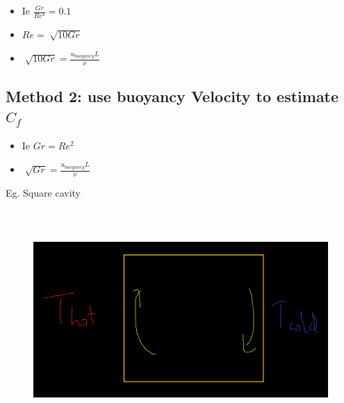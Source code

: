 \documentclass[12pt]{article}
\renewcommand{\_}{\kern-1.5pt\textunderscore\kern-1.5pt}
\begin{document}
\begin{itemize}
	\item Ie  \( \frac{Gr}{Re^{2}}=0.1 \) \par

	\item  \( Re=\sqrt[]{10Gr} \) \par

	\item  \( \sqrt[]{10Gr}=\frac{u_{buoyancy}L}{ \nu } \) \par


\end{itemize}

\subsection{ Method 2: use buoyancy Velocity to estimate  \( C_{f} \) }\par

\begin{itemize}
	\item Ie  \( Gr=Re^{2} \) \par

	\item  \( \sqrt[]{Gr}=\frac{u_{buoyancy}L}{ \nu } \) \par

\end{itemize}
\vspace{\baselineskip}

\vspace{\baselineskip}

\vspace{\baselineskip}
Eg. Square cavity\par




\begin{figure}[H]
	\begin{Center}
		\includegraphics[width=6.26in,height=3.3in]{./media/image6.png}
	\end{Center}
\end{figure}
\end{document}
